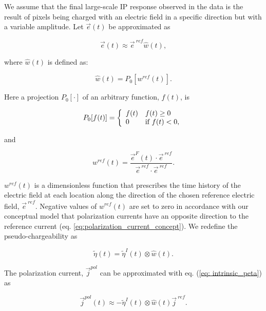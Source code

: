 \documentclass[extra,mreferee]{gji}
\renewcommand {\j}  { {\vec j} }
\newcommand {\e}  { {\vec e} }
\newcommand{\peta}{\tilde{\eta}}
\newcommand{\eref}{\e^{\ ref}}
\newcommand{\jref}{\j^{\ ref}}
\begin{document}
We assume that the final large-scale IP response observed in the data is the result of  pixels being charged with an electric field in a specific direction but with a variable amplitude. Let $\e(t)$ be approximated as
\begin{linenomath*}
\begin{equation}
  \e(t) \approx \eref \hat{w}(t),
  \label{eq: e_with_eref}
\end{equation}
\end{linenomath*}
where $\hat{w}(t)$ is defined as:
\begin{linenomath*}
\begin{equation}
  \hat{w}(t) = P_0[w^{ref}(t)].
  \label{eq: we}
\end{equation}
\end{linenomath*}
Here a projection $P_0[\cdot]$ of an arbitrary function, $f(t)$, is
\begin{linenomath*}
\begin{equation}
  P_0[f(t)] = \left\{ 
  \begin{array}{l l}
    f(t) & f(t) \ge 0 \\
    0 & \text{if } f(t) < 0, 
  \end{array}\right.
  \label{eq: P0}
\end{equation}
\end{linenomath*}
and
\begin{linenomath*}
\begin{equation}
  w^{ref}(t) = \frac{\e^F(t)\cdot\eref}{\eref\cdot\eref}.
  \label{eq: wref}
\end{equation}
\end{linenomath*}
$w^{ref}(t)$ is a dimensionless function that prescribes the time history of the electric field at each location along the direction of the chosen reference electric field, $\eref$.  Negative values of  $w^{ref}(t)$ are set to zero in accordance with our conceptual model that polarization currents have an opposite direction to the reference current (eq. \ref{eq:polarization_current_concept}).
We redefine the pseudo-chargeability as
\begin{linenomath*}
\begin{equation}
    \peta(t) = \peta^{I}(t)\otimes \hat{w}(t).
    \label{eq: pseudochargeability}
\end{equation}
\end{linenomath*}
The polarization current, $\j^{pol}$ can be approximated with eq. (\ref{eq: intrinsic_peta}) as
\begin{linenomath*}
\begin{equation}
  \j^{pol}(t) \approx - \peta^{I}(t)\otimes \hat{w}(t)\jref.
\end{equation}
\end{linenomath*}
\end{document}

